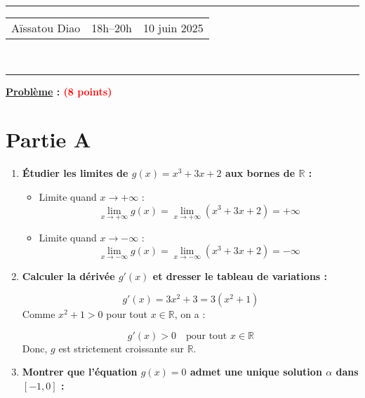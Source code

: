 \documentclass[a4paper,12pt]{article}
\begin{document}
\hrule
\begin{center}
    \begin{tabular}{@{} p{5cm} p{5cm} p{5cm} @{}} 
        Aïssatou Diao & \quad\quad\quad 18h–20h & 10 juin 2025 \\
    \end{tabular}
    \\[-0.01cm]
    \hrule
\end{center}

\vspace{0.3cm}
\textbf{\underline{Problème} : \textcolor{red}{(8 points)}}

\section*{Partie A}

\begin{enumerate}
    \item \textbf{Étudier les limites de \( g(x) = x^3 + 3x + 2 \) aux bornes de \( \mathbb{R} \) :}

    \begin{itemize}
        \item Limite quand \( x \to +\infty \) :
        \[
        \lim_{x \to +\infty} g(x) = \lim_{x \to +\infty} (x^3 + 3x + 2) = +\infty
        \]
        \item Limite quand \( x \to -\infty \) :
        \[
        \lim_{x \to -\infty} g(x) = \lim_{x \to -\infty} (x^3 + 3x + 2) = -\infty
        \]
    \end{itemize}

    \item \textbf{Calculer la dérivée \( g'(x) \) et dresser le tableau de variations :}

    \[
    g'(x) = 3x^2 + 3 = 3(x^2 + 1)
    \]
    Comme \( x^2 + 1 > 0 \) pour tout \( x \in \mathbb{R} \), on a :

    \[
    g'(x) > 0 \quad \text{pour tout } x \in \mathbb{R}
    \]
    Donc, \( g \) est strictement croissante sur \( \mathbb{R} \).

    \begin{center}
    \end{center}

    \item \textbf{Montrer que l’équation \( g(x) = 0 \) admet une unique solution \( \alpha \) dans \( [-1, 0] \) :}


\end{enumerate}
\end{document}
